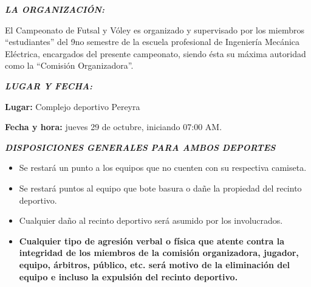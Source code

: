 \documentclass[11pt,a4paper]{article}
\newcommand{\titulo}[1]{\par\medskip\textbf{\textit{#1}}\par}
\begin{document}
\titulo{LA ORGANIZACIÓN:}
El Campeonato de Futsal y Vóley es organizado y supervisado por los miembros ``estudiantes'' del 9no semestre de la escuela profesional de Ingeniería Mecánica Eléctrica, encargados del presente campeonato, siendo ésta su máxima autoridad como la ``Comisión Organizadora''.

\titulo{LUGAR Y FECHA:}
\textbf{Lugar:} Complejo deportivo Pereyra

\textbf{Fecha y hora:} jueves 29 de octubre, iniciando 07:00 AM.

\titulo{DISPOSICIONES GENERALES PARA AMBOS DEPORTES}
\begin{itemize}
	\item Se restará un punto a los equipos que no cuenten con su respectiva camiseta.
	\item Se restará puntos al equipo que bote basura o dañe la propiedad del recinto deportivo.
	\item Cualquier daño al recinto deportivo será asumido por los involucrados.
	\item \textbf{Cualquier tipo de agresión verbal o física que atente contra la integridad de los miembros de la comisión organizadora, jugador, equipo, árbitros, público, etc. será motivo de la eliminación del equipo e incluso la expulsión del recinto deportivo.}
\end{itemize}
\end{document}
